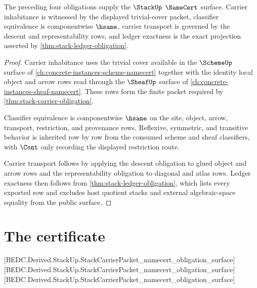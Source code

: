 \begin{theorem}\label{thm:stack-namecert-obligation}
The preceding four obligations supply the $\StackUp$ $\NameCert$ surface. Carrier inhabitance is witnessed by the displayed trivial-cover packet, classifier equivalence is componentwise $\hsame$, carrier transport is governed by the descent and representability rows, and ledger exactness is the exact projection asserted by \autoref{thm:stack-ledger-obligation}.
\end{theorem}
\begin{proof}
Carrier inhabitance uses the trivial cover available in the $\SchemeUp$ surface of \autoref{ch:concrete-instances-scheme-namecert} together with the identity local object and arrow rows read through the $\SheafUp$ surface of \autoref{ch:concrete-instances-sheaf-namecert}. These rows form the finite packet required by \autoref{thm:stack-carrier-obligation}.

Classifier equivalence is componentwise $\hsame$ on the site, object, arrow, transport, restriction, and provenance rows. Reflexive, symmetric, and transitive behavior is inherited row by row from the consumed scheme and sheaf classifiers, with $\Cont$ only recording the displayed restriction route.

Carrier transport follows by applying the descent obligation to glued object and arrow rows and the representability obligation to diagonal and atlas rows. Ledger exactness then follows from \autoref{thm:stack-ledger-obligation}, which lists every exported row and excludes host quotient stacks and external algebraic-space equality from the public surface.
\end{proof}

\section{The certificate}
\label{sec:stack-certificate}
[BEDC.Derived.StackUp.StackCarrierPacket\_namecert\_obligation\_surface]
[BEDC.Derived.StackUp.StackCarrierPacket\_namecert\_obligation\_surface]
[BEDC.Derived.StackUp.StackCarrierPacket\_namecert\_obligation\_surface]

